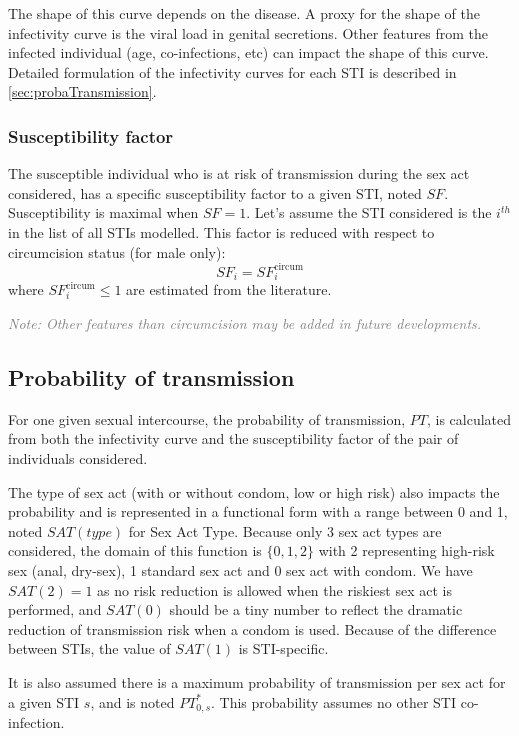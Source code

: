 \documentclass[11pt, onecolumn]{article}
\newcommand{\note}[1]{\textit{\textcolor{Grey}{Note: #1}}}
\begin{document}
The shape of this curve depends on the disease. A proxy for the shape of the infectivity curve is the viral load in genital secretions. Other features from the infected individual (age, co-infections, etc) can impact the shape of this curve. Detailed formulation of the infectivity curves for each STI is described in \ref{sec:probaTransmission}.

\subsubsection*{Susceptibility factor}
The susceptible individual who is at risk of transmission during the sex act considered, has a specific susceptibility factor to a given STI, noted $SF$. Susceptibility is maximal when $SF=1$. Let's assume the STI considered is the $i^{th}$ in the list of all STIs modelled. This factor is reduced with respect to circumcision status (for male only):
$$SF_i =SF_i^{\mathrm{circum}} $$
where $SF_i^{\mathrm{circum}}\leq 1$ are estimated from the literature.

\note{Other features than circumcision may be added in future developments.}

\subsection{Probability of transmission}

For one given sexual intercourse, the probability of transmission, $PT$, is calculated from both the infectivity curve and the susceptibility factor of the pair of individuals considered. 

The type of sex act (with or without condom, low or high risk) also impacts the probability and is represented in a functional form with a range between 0 and 1, noted $SAT(type)$ for Sex Act Type. Because only 3 sex act types are considered, the domain of this function is $\{0,1,2\}$ with 2 representing high-risk sex (anal, dry-sex), 1 standard sex act and 0 sex act with condom. We have $SAT(2)=1$ as no risk reduction is allowed when the riskiest sex act is performed, and $SAT(0)$ should be a tiny number to reflect the dramatic reduction of transmission risk when a condom is used. Because of the difference between STIs, the value of $SAT(1)$ is STI-specific.

It is also assumed there is a maximum probability of transmission per sex act for a given STI $s$, and is noted $PT_{0,s}^*$. This probability assumes no other STI co-infection. 
\end{document}
